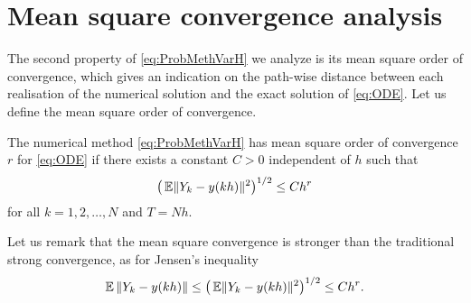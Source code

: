 \documentclass[final,onefignum,onetabnum]{siamonline171218}
\begin{document}
\section{Mean square convergence analysis}\label{sec:StrongOrder}

The second property of \eqref{eq:ProbMethVarH} we analyze is its mean square order of convergence, which gives an indication on the path-wise distance between each realisation of the numerical solution and the exact solution of \eqref{eq:ODE}. Let us define the mean square order of convergence. 
\begin{definition} The numerical method \eqref{eq:ProbMethVarH} has mean square order of convergence $r$ for \eqref{eq:ODE} if there exists a constant $C > 0$ independent of $h$ such that
	\begin{equation}
	\big(\operatorname{\mathbb{E}}\lVert Y_k - y(kh)\rVert^2\big)^{1/2} \leq Ch^r
	\end{equation}
	for all $k = 1, 2, \ldots, N$ and $T = Nh$.
\end{definition} 
\begin{remark} Let us remark that the mean square convergence is stronger than the traditional strong convergence, as for Jensen's inequality 
	\begin{equation}
		\operatorname{\mathbb{E}}{\lVert Y_k - y(kh)\rVert} \leq \big(\operatorname{\mathbb{E}}\lVert Y_k - y(kh)\rVert^2\big)^{1/2} \leq Ch^r.
	\end{equation}	
\end{remark}
\end{document}
